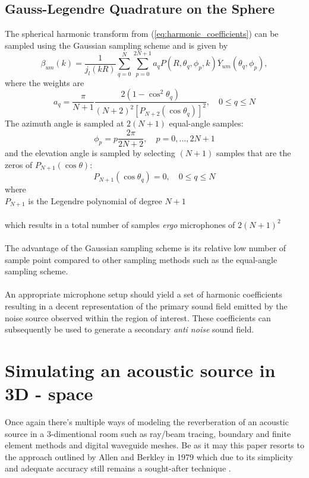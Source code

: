 \subsection{Gauss-Legendre Quadrature on the Sphere}\label{sec:Gauss}
The spherical harmonic transform from (\ref{eq:harmonic_coefficients}) can be sampled using the Gaussian sampling scheme and is given by
\begin{equation}
    \beta_{um}(k) = \frac{1}{j_l(kR)} \sum_{q=0}^N\sum_{p=0}^{2N+1}a_qP(R,\theta_q,\phi_p,k)\overline Y_{um}(\theta_q,\phi_p),
    \label{eq:gauss_harmonic_coefficients}
\end{equation}
where the weights are
\begin{equation}
    a_q = \frac{\pi}{N+1}\frac{2(1-\cos^2\theta_q)}{(N+2)^2[P_{N+2}(\cos \theta_q)]^2}, \quad 0 \leq q\leq N
    \label{eq:gauss_weights}
\end{equation}
The azimuth angle is sampled at $2(N+1)$ equal-angle samples:
\begin{equation}
    \phi_p = p\frac{2\pi}{2N+2},\quad p=0,...,2N+1
    \label{eq:azimuth_sample}
\end{equation}
and the elevation angle is sampled by selecting $(N+1)$ samples that are the zeros of $P_{N+1}(\cos\theta)$:
\begin{equation}
    P_{N+1}(\cos\theta_q)=0, \quad 0 \leq q \leq N
    \label{eq:elevation_sample}
\end{equation}
where\\
$P_{N+1}$ is the Legendre polynomial of degree $N+1$\\\\
which results in a total number of samples \textit{ergo} microphones of $2(N+1)^2$\\\\
The advantage of the Gaussian sampling scheme is its relative low number of sample point compared to other sampling methods such as the equal-angle sampling scheme\cite{Rafaely2015}.\\\\
An appropriate microphone setup should yield a set of harmonic coefficients resulting in a decent representation of the primary sound field emitted by the noise source observed within the region of interest. These coefficients can subsequently be used to generate a secondary \textit{anti noise} sound field.





\section{Simulating an acoustic source in 3D - space}\label{sec:Simulation}
Once again there's multiple ways of modeling the reverberation of an acoustic source in a 3-dimentional room such as ray/beam tracing, boundary and finite element methods and digital waveguide meshes. Be as it may this paper resorts to the approach outlined by Allen and Berkley in 1979 which due to its simplicity and adequate accuracy still remains a sought-after technique \cite{Samarasinghe2018}.

